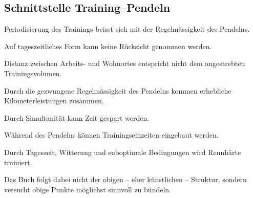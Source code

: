 \subsection{Schnittstelle Training--Pendeln}


  \begin{itemize*}
    \item Periodisierung des Trainings beisst sich mit der Regelmässigkeit des Pendelns.
    \item Auf tageszeitliches Form kann keine Rücksicht genommen werden.
    \item Distanz zwischen Arbeits- und Wohnortes entspricht nicht dem angestrebten Trainingsvolumen.
  \end{itemize*}


  \begin{itemize*}
    \item Durch die gezwungene Regelmässigkeit des Pendelns kommen erhebliche Kilometerleistungen zusammen.
    \item Durch Simultanität kann Zeit gespart werden.
    \item Während des Pendelns können Trainingseinzeiten eingebaut werden.
    \item Durch Tageszeit, Witterung und suboptimale Bedingungen wird Rennhärte trainiert.
  \end{itemize*}

Das Buch folgt dabei nicht der obigen -- eher künstlichen -- Struktur, sondern versucht obige Punkte möglichst sinnvoll zu bündeln.


% 
% 
% 
% 



